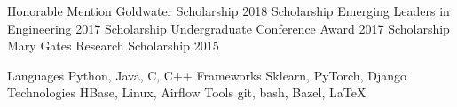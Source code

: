 \begin{multicols}{2}
	\vspace{-2.1em}
	\begin{cvhonors}
		\cvhonor
			{Honorable Mention}
			{Goldwater Scholarship}
			{}
			{2018}
		\cvhonor
			{Scholarship}
			{Emerging Leaders in Engineering}
			{}
			{2017}
		\cvhonor
			{Scholarship}
			{Undergraduate Conference Award}
			{}
			{2017}
		\cvhonor
			{Scholarship}
			{Mary Gates Research Scholarship}
			{}
			{2015}

	\end{cvhonors}
    \vspace{-4em}
	\vspace{-2.1em}
	\begin{cvskills}
		\cvskill
			{Languages}
			{Python, Java, C, C++}
		\cvskill
			{Frameworks}
			{Sklearn, PyTorch, Django}
        \cvskill
            {Technologies}
            {HBase, Linux, Airflow}
		\cvskill
			{Tools}
			{git, bash, Bazel, \LaTeX}
	\end{cvskills}
    \vspace{-4em}
\end{multicols}
    \vspace{-1.5em}
